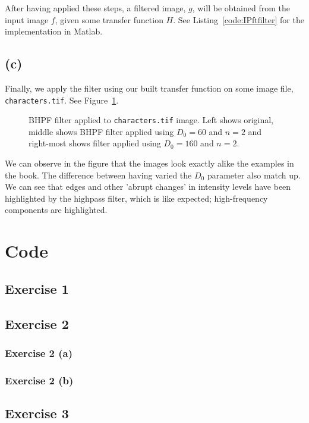 \documentclass{article}
\begin{document}
After having applied these steps, a filtered image, $g$, will be obtained from the input image $f$, given some transfer function $H$. See  Listing~\ref{code:IPftfilter} for the implementation in Matlab.

\subsection*{(c)} Finally, we apply the filter using our built transfer function on some image file, \texttt{characters.tif}. See Figure~\ref{fig:characters_all_bhpf}.

\begin{figure}[ht]
    \centering
    
    \caption{BHPF filter applied to \texttt{characters.tif} image. Left shows original, middle shows BHPF filter applied using $D_0 = 60$ and $n = 2$ and right-most shows filter applied using $D_0 = 160$ and $n = 2$.}
    \label{fig:characters_all_bhpf}
\end{figure}

We can observe in the figure that the images look exactly alike the examples in the book. The difference between having varied the $D_0$ parameter also match up. We can see that edges and other 'abrupt changes' in intensity levels have been highlighted by the highpass filter, which is like expected; high-frequency components are highlighted.

\typeout{}


\appendix
\section{Code}
\subsection{Exercise 1}
\subsection{Exercise 2}
\subsubsection{Exercise 2 (a)}


\subsubsection{Exercise 2 (b)}

\subsection{Exercise 3}
\end{document}
